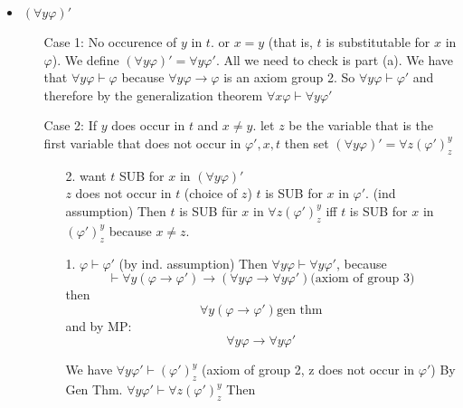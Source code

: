 {\begin{itemize}
\begin{enumerate}
\[\begin{aligned}
                    \varphi \to \psi &; \varphi' \vdash \psi\\
                \end{aligned}\]
                \item ok by definition of SUB
            \end{enumerate}
        \item $(\forall y \varphi)'$\begin{itemize}
            \item[Case 1:] No occurence of $y$ in $t$. or $x=y$ (that is, $t$ is substitutable for $x$ in $\varphi$). We define $(\forall y \varphi)' = \forall y \varphi'$. All we need to check is part (a). 
                We have that $\forall y \varphi \vdash \varphi$ because $\forall y \varphi \to \varphi$ is an axiom group 2.
                So $\forall y \varphi \vdash \varphi'$ and therefore by the generalization theorem $\forall x \varphi \vdash \forall y \varphi'$
            \item[Case 2:] If $y$ does occur in $t$ and $x\neq y$. let $z$ be the variable that is the first variable that does not occur in $\varphi', x, t$ then set
                $(\forall y \varphi)' = \forall z (\varphi')^y_z$
                \begin{enumerate}
                    \item[2.] want $t$ SUB for $x$ in $(\forall y \varphi)'$ \\
                    $z$ does not occur in $t$ (choice of $z$)
                    $t$ is SUB for $x$ in $\varphi'$. (ind assumption)
                    Then $t$ is SUB für $x$ in $\forall z (\varphi')^y_z$ iff $t$ is SUB for $x$ in $(\varphi')^y_z$ because $x\neq z$.
                    \item[1.] $\varphi \vdash \varphi'$ (by ind. assumption)
                    Then $\forall y \varphi \vdash \forall y \varphi'$, because
                    \[\vdash \forall y (\varphi \to \varphi')\to (\forall y \varphi \to \forall y \varphi') \text{(axiom of group 3)}\]
                    then \[\forall y (\varphi \to \varphi')\text{gen thm}\]
                    and by MP: \[ \forall y \varphi \to \forall y \varphi'\]
                    
                    We have $\forall y \varphi' \vdash (\varphi')^y_z$ (axiom of group 2, z does not occur in $\varphi'$)
                    By Gen Thm. $\forall y \varphi' \vdash \forall z (\varphi')^y_z$
                    Then 



\end{enumerate}
\end{itemize}
\end{itemize}}
